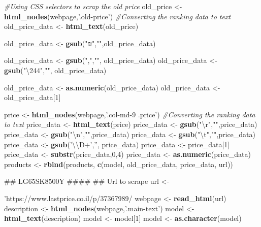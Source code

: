 \documentclass[]{article}
\newenvironment{Shaded}{\begin{snugshade}}{\end{snugshade}}
\newcommand{\KeywordTok}[1]{\textcolor[rgb]{0.13,0.29,0.53}{\textbf{#1}}}
\newcommand{\DecValTok}[1]{\textcolor[rgb]{0.00,0.00,0.81}{#1}}
\newcommand{\CharTok}[1]{\textcolor[rgb]{0.31,0.60,0.02}{#1}}
\newcommand{\StringTok}[1]{\textcolor[rgb]{0.31,0.60,0.02}{#1}}
\newcommand{\CommentTok}[1]{\textcolor[rgb]{0.56,0.35,0.01}{\textit{#1}}}
\newcommand{\NormalTok}[1]{#1}
\begin{document}
\begin{Shaded}
\begin{Highlighting}[]
{{{{\CommentTok{#Using CSS selectors to scrap the old price}
\NormalTok{old_price <-}\StringTok{ }\KeywordTok{html_nodes}\NormalTok{(webpage,}\StringTok{'.old-price'}\NormalTok{)}
\CommentTok{#Converting the ranking data to text }
\NormalTok{old_price_data <-}\StringTok{ }\KeywordTok{html_text}\NormalTok{(old_price)}

\NormalTok{old_price_data <-}\StringTok{ }\KeywordTok{gsub}\NormalTok{(}\StringTok{"₪"}\NormalTok{,}\StringTok{""}\NormalTok{,old_price_data)}

\NormalTok{old_price_data <-}\StringTok{ }\KeywordTok{gsub}\NormalTok{(}\StringTok{","}\NormalTok{,}\StringTok{""}\NormalTok{, old_price_data)}
\NormalTok{old_price_data <-}\StringTok{ }\KeywordTok{gsub}\NormalTok{(}\StringTok{"\textbackslash{}244"}\NormalTok{,}\StringTok{""}\NormalTok{, old_price_data)}

\NormalTok{old_price_data <-}\StringTok{ }\KeywordTok{as.numeric}\NormalTok{(old_price_data)}
\NormalTok{old_price_data <-}\StringTok{ }\NormalTok{old_price_data[}\DecValTok{1}\NormalTok{]}

\NormalTok{price <-}\StringTok{ }\KeywordTok{html_nodes}\NormalTok{(webpage,}\StringTok{'.col-md-9 .price'}\NormalTok{)}
\CommentTok{#Converting the ranking data to text }
\NormalTok{price_data <-}\StringTok{ }\KeywordTok{html_text}\NormalTok{(price)}
\NormalTok{price_data <-}\StringTok{ }\KeywordTok{gsub}\NormalTok{(}\StringTok{"}\CharTok{\textbackslash{}r}\StringTok{"}\NormalTok{,}\StringTok{""}\NormalTok{,price_data) }
\NormalTok{price_data <-}\StringTok{ }\KeywordTok{gsub}\NormalTok{(}\StringTok{"}\CharTok{\textbackslash{}n}\StringTok{"}\NormalTok{,}\StringTok{""}\NormalTok{,price_data) }
\NormalTok{price_data <-}\StringTok{ }\KeywordTok{gsub}\NormalTok{(}\StringTok{"}\CharTok{\textbackslash{}t}\StringTok{"}\NormalTok{,}\StringTok{""}\NormalTok{,price_data) }
\NormalTok{price_data <-}\StringTok{ }\KeywordTok{gsub}\NormalTok{(}\StringTok{'}\CharTok{\textbackslash{}\textbackslash{}}\StringTok{D+'}\NormalTok{,}\StringTok{''}\NormalTok{, price_data)}
\NormalTok{price_data <-}\StringTok{ }\NormalTok{price_data[}\DecValTok{1}\NormalTok{]}
\NormalTok{price_data <-}\StringTok{ }\KeywordTok{substr}\NormalTok{(price_data,}\DecValTok{0}\NormalTok{,}\DecValTok{4}\NormalTok{)}
\NormalTok{price_data <-}\StringTok{ }\KeywordTok{as.numeric}\NormalTok{(price_data)}
\NormalTok{products <-}\StringTok{ }\KeywordTok{rbind}\NormalTok{(products, }\KeywordTok{c}\NormalTok{(model, old_price_data, price_data, url))}

\NormalTok{## LG65SK8500Y ####}
\NormalTok{## Url to scrape}
\NormalTok{url <-}\StringTok{'https://www.lastprice.co.il/p/37367989/%D7%98%D7%9C%D7%95%D7%95%D7%99%D7%96%D7%99%D7%94-65-LG/LG-65SK8500Y'}
\NormalTok{webpage <-}\StringTok{ }\KeywordTok{read_html}\NormalTok{(url) }
\NormalTok{description <-}\StringTok{ }\KeywordTok{html_nodes}\NormalTok{(webpage,}\StringTok{'.main-text'}\NormalTok{)}
\NormalTok{model <-}\StringTok{ }\KeywordTok{html_text}\NormalTok{(description)}
\NormalTok{model <-}\StringTok{ }\NormalTok{model[}\DecValTok{1}\NormalTok{]}
\NormalTok{model <-}\StringTok{ }\KeywordTok{as.character}\NormalTok{(model)}

}}}}}
\end{Highlighting}
\end{Shaded}
\end{document}
